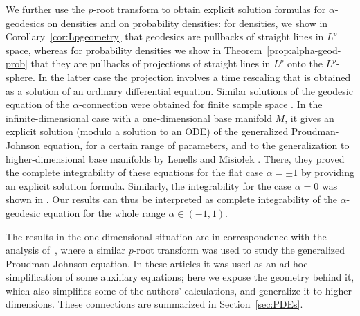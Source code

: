 \documentclass[11pt]{amsart}
\theoremstyle{definition}
\begin{document}
We further use the $p$-root transform to obtain explicit solution formulas for $\alpha$-geodesics on densities and on probability densities:
for densities, we show in Corollary~\ref{cor:Lpgeometry} that geodesics are pullbacks of straight lines in $L^p$ space, whereas for probability densities we show in Theorem~\ref{prop:alpha-geod-prob} that they are pullbacks of projections of straight lines in $L^p$ onto the $L^p$-sphere. 
In the latter case the projection involves a time rescaling that is obtained as a solution of an ordinary differential equation.
Similar solutions of the geodesic equation of the $\alpha$-connection were obtained for finite sample space \cite[pp.~50-51]{ay2017information}.
In the infinite-dimensional case with a one-dimensional base manifold $M$, it gives an explicit solution (modulo a solution to an ODE) of the  generalized Proudman-Johnson equation, for a certain range of parameters, and to the generalization to higher-dimensional base manifolds by Lenells and Misio\l{}ek \cite{lenells2014amari}.
There, they proved the complete integrability of these equations for the flat case $\alpha = \pm 1$ by providing an explicit solution formula.
Similarly, the integrability for the case $\alpha = 0$ was shown in \cite{khesin2013geometry}.
Our results can thus be interpreted as complete integrability of the $\alpha$-geodesic equation for the whole range $\alpha \in (-1,1)$.

The results in the one-dimensional situation are in correspondence with the analysis of~\cite{kogelbauer2020global,sarria2013blow}, where a similar $p$-root transform was  used to study the generalized Proudman-Johnson equation. In these articles it was used as an ad-hoc simplification of some auxiliary equations; here we expose the geometry behind it, which also simplifies some of the authors' calculations, and generalize it to higher dimensions.
These connections are summarized in Section~\ref{sec:PDEs}.

\end{document}

